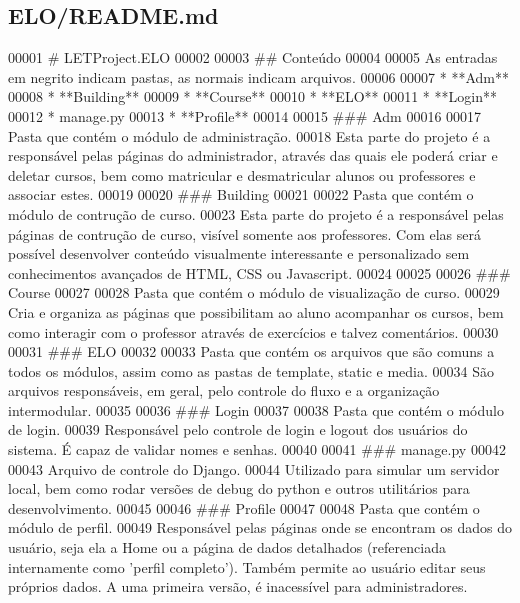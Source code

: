 \hypertarget{ELO_2README_8md_source}{}\subsection{E\+L\+O/\+R\+E\+A\+D\+M\+E.md}

\begin{DoxyCode}
00001 # LETProject.ELO
00002 
00003 ## Conteúdo
00004 
00005 As entradas em negrito indicam pastas, as normais indicam arquivos.
00006 
00007 * **Adm**
00008 * **Building**
00009 * **Course**
00010 * **ELO**
00011 * **Login**
00012 * manage.py
00013 * **Profile**
00014 
00015 ### Adm
00016 
00017 Pasta que contém o módulo de administração.
00018 Esta parte do projeto é a responsável pelas páginas do administrador, através das quais ele poderá
       criar e deletar cursos, bem como matricular e desmatricular alunos ou professores e associar estes.
00019 
00020 ### Building
00021 
00022 Pasta que contém o módulo de contrução de curso.
00023 Esta parte do projeto é a responsável pelas páginas de contrução de curso, visível somente aos
       professores. Com elas será possível desenvolver conteúdo visualmente interessante e personalizado sem conhecimentos
       avançados de HTML, CSS ou Javascript.
00024 
00025 
00026 ### Course
00027 
00028 Pasta que contém o módulo de visualização de curso.
00029 Cria e organiza as páginas que possibilitam ao aluno acompanhar os cursos, bem como interagir com o
       professor através de exercícios e talvez comentários.
00030 
00031 ### ELO
00032 
00033 Pasta que contém os arquivos que são comuns a todos os módulos, assim como as pastas de template,
       static e media.
00034 São arquivos responsáveis, em geral, pelo controle do fluxo e a organização intermodular.
00035 
00036 ### Login
00037 
00038 Pasta que contém o módulo de login.
00039 Responsável pelo controle de login e logout dos usuários do sistema. É capaz de validar nomes e
       senhas.
00040 
00041 ### manage.py
00042 
00043 Arquivo de controle do Django.
00044 Utilizado para simular um servidor local, bem como rodar versões de debug do python e outros
       utilitários para desenvolvimento.
00045 
00046 ### Profile
00047 
00048 Pasta que contém o módulo de perfil.
00049 Responsável pelas páginas onde se encontram os dados do usuário, seja ela a Home ou a página de dados
       detalhados (referenciada internamente como 'perfil completo'). Também permite ao usuário editar seus
       próprios dados. A uma primeira versão, é inacessível para administradores.
\end{DoxyCode}
